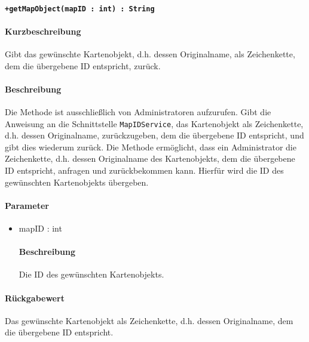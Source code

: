\paragraph*{\texttt{+getMapObject(mapID : int) : String}}%
\paragraph*{Kurzbeschreibung}
Gibt das gewünschte Kartenobjekt, d.h. dessen Originalname, als Zeichenkette, dem die übergebene ID entspricht, zurück.
\paragraph*{Beschreibung}
Die Methode ist ausschließlich von Administratoren aufzurufen.
Gibt die Anweisung an die Schnittstelle \texttt{MapIDService}, das Kartenobjekt als Zeichenkette, d.h. dessen Originalname, zurückzugeben, dem die übergebene ID entspricht, und gibt dies wiederum zurück.
Die Methode ermöglicht, dass ein Administrator die Zeichenkette, d.h. dessen Originalname des Kartenobjekts, dem die übergebene ID entspricht, anfragen und zurückbekommen kann.
Hierfür wird die ID des gewünschten Kartenobjekts übergeben.
\paragraph*{Parameter}
\begin{itemize}
	\item mapID : int
		\paragraph*{Beschreibung}
		Die ID des gewünschten Kartenobjekts.
\end{itemize}
\paragraph*{Rückgabewert}
Das gewünschte Kartenobjekt als Zeichenkette, d.h. dessen Originalname, dem die übergebene ID entspricht.
